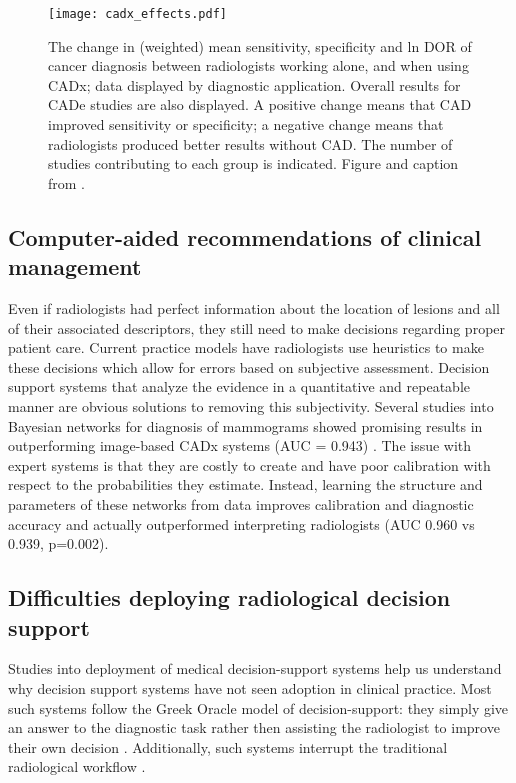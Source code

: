 \begin{figure}[h!]
	\centering
	\texttt{[image: cadx\_effects.pdf]}
	\caption[Effect of CADx on practice over 48 different studies]{The change in (weighted) mean sensitivity, specificity and ln DOR of cancer diagnosis between radiologists working alone, and when using CADx; data displayed by diagnostic application. Overall results for CADe studies are also displayed. A positive change means that CAD improved sensitivity or specificity; a negative change means that radiologists produced better results without CAD. The number of studies contributing to each group is indicated. Figure and caption from \cite{Eadie:2011cv}.}
	\label{fig:cadx_effects}
\end{figure}

\subsection{Computer-aided recommendations of clinical management}
Even if radiologists had perfect information about the location of lesions and all of their associated descriptors, they still need to make decisions regarding proper patient care. Current practice models have radiologists use heuristics to make these decisions which allow for errors based on subjective assessment. Decision support systems that analyze the evidence in a quantitative and repeatable manner are obvious solutions to removing this subjectivity. Several studies into Bayesian networks for diagnosis of mammograms showed promising results in outperforming image-based CADx systems (AUC = 0.943) \cite{Burnside:2000wl,ElizabethS:2005gc,Rubin:2005jg}. The issue with expert systems is that they are costly to create and have poor calibration with respect to the probabilities they estimate. Instead, learning the structure and parameters of these networks from data improves calibration and diagnostic accuracy \cite{Burnside:2009br} and actually outperformed interpreting radiologists (AUC 0.960 vs 0.939, p=0.002).

\subsection{Difficulties deploying radiological decision support}
Studies into deployment of medical decision-support systems help us understand why decision support systems have not seen adoption in clinical practice. Most such systems follow the Greek Oracle model of decision-support: they simply give an answer to the diagnostic task rather then assisting the radiologist to improve their own decision \cite{Miller:1990wg, Friedman:2009dx, Bright:2012ga}. Additionally, such systems interrupt the traditional radiological workflow \cite{Morgan:2011ct}. 

